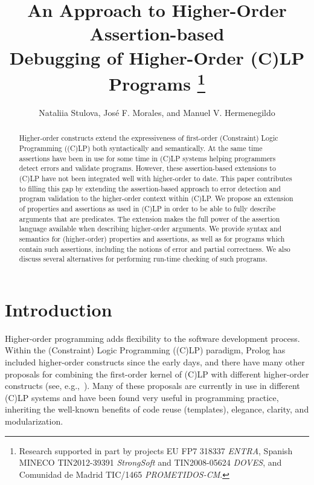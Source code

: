 \documentclass{llncs}
\title{An Approach to Higher-Order Assertion-based \\ Debugging
       of Higher-Order (C)LP Programs
  \thanks{Research supported in part by projects EU
    FP7 318337 \emph{ENTRA}, Spanish MINECO TIN2012-39391
    \emph{StrongSoft} and TIN2008-05624 \emph{DOVES}, and Comunidad de
    Madrid TIC/1465 \emph{PROMETIDOS-CM}.}
}
\author{Nataliia Stulova,\inst{1} Jos\'{e} F. Morales,\inst{1}
 and Manuel V. Hermenegildo\inst{1,2}}
\institute{IMDEA Software Institute, Madrid, Spain
\and School of Computer Science, T. U. Madrid (UPM), Spain}
\begin{document}
\maketitle



\begin{abstract}
  Higher-order constructs extend the expressiveness of first-order
  (Constraint) Logic Programming ((C)LP) both syntactically and
  semantically. At the same time assertions have been in use for some
  time in (C)LP systems helping programmers detect errors and
  validate programs. However, these assertion-based extensions to
  (C)LP have not been integrated well with higher-order to date. This
  paper contributes to filling this gap by extending the
  assertion-based approach to error detection and program validation
  to the higher-order context within (C)LP. We propose an extension
  of properties and assertions as used in (C)LP in order to be able
  to fully describe arguments that are predicates. The extension
  makes the full power of the assertion language available when
  describing higher-order arguments. We provide syntax and semantics
  for (higher-order) properties and assertions, as well as for
  programs which contain such assertions, including the notions of
  error and partial correctness. We also discuss several alternatives
  for performing run-time checking of such programs.
\end{abstract}



\section{Introduction}

Higher-order programming adds flexibility to the software development
process. Within the (Constraint) Logic Programming ((C)LP) paradigm,
Prolog has included higher-order constructs since the early days, and
there have many other proposals for combining the first-order kernel
of (C)LP with different higher-order constructs (see,
e.g.,~\cite{warren-hiord,hiord-naish,ChenKiferWarren93,NadathurMiller98,ciao-hiord,daniel-phd}). Many of these proposals
are currently in use in different (C)LP systems and have been found
very useful in programming practice, inheriting the well-known
benefits of code reuse (templates), elegance, clarity, and
modularization.
\end{document}
